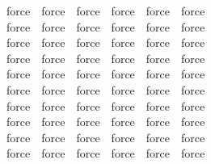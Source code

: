 \begin{isabellebody}
\ \ \isamarkupfalse \ force\ \isamarkupfalse \ force\ \isamarkupfalse \ force\ \isamarkupfalse \ force\ \isamarkupfalse \ force\ \isamarkupfalse \ force\isanewline
\ \ \isamarkupfalse \ force\ \isamarkupfalse \ force\ \isamarkupfalse \ force\ \isamarkupfalse \ force\ \isamarkupfalse \ force\ \isamarkupfalse \ force\isanewline
\ \ \isamarkupfalse \ force\ \isamarkupfalse \ force\ \isamarkupfalse \ force\ \isamarkupfalse \ force\ \isamarkupfalse \ force\ \isamarkupfalse \ force\isanewline
\ \ \isamarkupfalse \ force\ \isamarkupfalse \ force\ \isamarkupfalse \ force\ \isamarkupfalse \ force\ \isamarkupfalse \ force\ \isamarkupfalse \ force\isanewline
\ \ \isamarkupfalse \ force\ \isamarkupfalse \ force\ \isamarkupfalse \ force\ \isamarkupfalse \ force\ \isamarkupfalse \ force\ \isamarkupfalse \ force\isanewline
\ \ \isamarkupfalse \ force\ \isamarkupfalse \ force\ \isamarkupfalse \ force\ \isamarkupfalse \ force\ \isamarkupfalse \ force\ \isamarkupfalse \ force\isanewline
\ \ \isamarkupfalse \ force\ \isamarkupfalse \ force\ \isamarkupfalse \ force\ \isamarkupfalse \ force\ \isamarkupfalse \ force\ \isamarkupfalse \ force\isanewline
\ \ \isamarkupfalse \ force\ \isamarkupfalse \ force\ \isamarkupfalse \ force\ \isamarkupfalse \ force\ \isamarkupfalse \ force\ \isamarkupfalse \ force\isanewline
\ \ \isamarkupfalse \ force\ \isamarkupfalse \ force\ \isamarkupfalse \ force\ \isamarkupfalse \ force\ \isamarkupfalse \ force\ \isamarkupfalse \ force\isanewline
\ \ \isamarkupfalse \ force\ \isamarkupfalse \ force\ \isamarkupfalse \ force\ \isamarkupfalse \ force\ \isamarkupfalse \ force\ \isamarkupfalse \ force\isanewline

\end{isabellebody}
